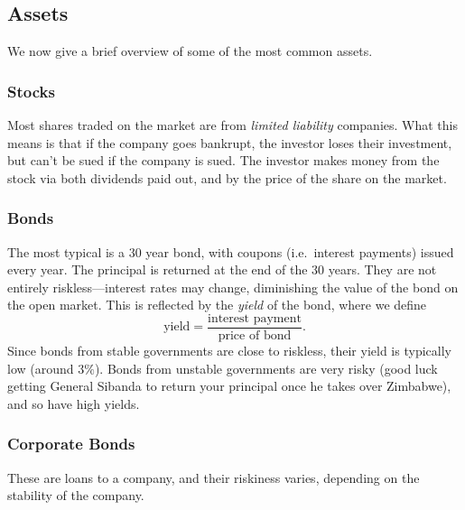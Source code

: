 \documentclass[12pt]{article}
\theoremstyle{plain}
\theoremstyle{definition}
\theoremstyle{remark}
\numberwithin{equation}{section}  %
\begin{document}
\subsection{Assets}
We now give a brief overview of some of the most common assets.

\subsubsection{Stocks}
Most shares traded on the market are from \emph{limited liability} companies.
What this means is that if the company goes bankrupt, the investor loses their investment, but can't be sued if the company is sued. The investor makes money from the stock via both dividends paid out, and by the price of the share on the market.

\subsubsection{Bonds}
The most typical is a $30$ year bond, with coupons (i.e.\ interest payments) issued every year. The principal is returned at the end of the $30$ years.
They are  not entirely riskless---interest rates may change, diminishing the value of the bond on the open market. This is reflected by the \emph{yield} of the bond, where we define \begin{equation*}
    \text{yield} = \frac{\text{interest payment}}{\text{price of bond}}.
\end{equation*}
Since bonds from stable governments are close to riskless, their yield is typically low (around $3\%$). Bonds from unstable governments are very risky (good luck getting General Sibanda to return your principal once he takes over Zimbabwe), and so have high yields.
\subsubsection{Corporate Bonds}
These are loans to a company, and their riskiness varies, depending on the stability of the company. 
\end{document}
